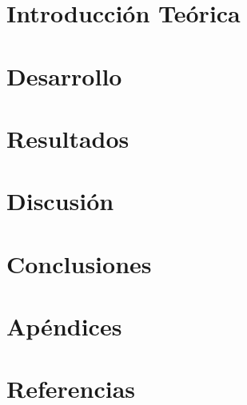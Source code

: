 \documentclass[a4paper]{article}
\begin{document}



\titulotp


\section{Introducci\'on Te\'orica}



\section{Desarrollo}



\section{Resultados}



\section{Discusi\'on}



\section{Conclusiones}



\section{Ap\'endices}



\section{Referencias}


\end{document}
